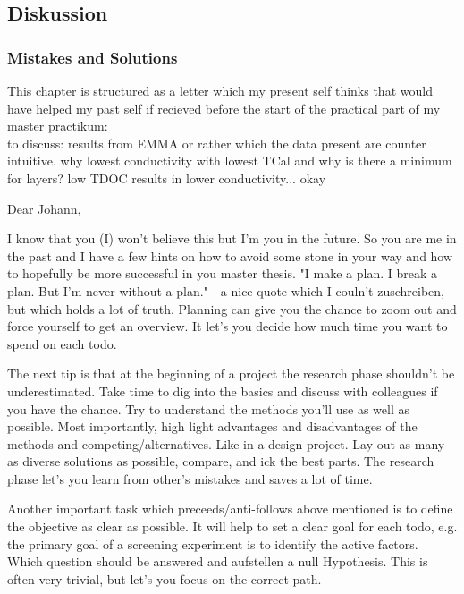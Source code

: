 \subsection{Diskussion}
\subsubsection{Mistakes and Solutions}
This chapter is structured as a letter 
which my present self thinks that would have helped my past self 
if recieved before the start of the practical part of my master practikum:\\

to discuss: results from EMMA or rather which the data present are counter intuitive. 
why lowest conductivity with lowest TCal and why is there a minimum for layers? 
low TDOC results in lower conductivity... okay 

\iffalse
Dear Johann, 

I know that you (I) won't believe this but I'm you in the future. 
So you are me in the past and I have a few hints on how to avoid some stone in your way 
and how to hopefully be more successful in you master thesis. 
"I make a plan. I break a plan. But I'm never without a plan." - a nice quote which I couln't zuschreiben, but which holds a lot of truth. 
Planning can give you the chance to zoom out and force yourself to get an overview. 
It let's you decide how much time you want to spend on each todo. 

The next tip is that at the beginning of a project the research phase shouldn't be underestimated. 
Take time to dig into the basics and discuss with colleagues if you have the chance. 
Try to understand the methods you'll use as well as possible. 
Most importantly, high light advantages and disadvantages of the methods and competing/alternatives. 
Like in a design project. Lay out as many as diverse solutions as possible, 
compare, and ick the best parts.
The research phase let's you learn from other's mistakes and saves a lot of time. 

Another important task which preceeds/anti-follows above mentioned is to define the objective as clear as possible.  
It will help to set a clear goal for each todo, e.g. 
the primary goal of a screening experiment is to identify the active factors.\cite{miller2001using}
Which question should be answered and aufstellen a null Hypothesis. 
This is often very trivial, but let's you focus on the correct path. 

